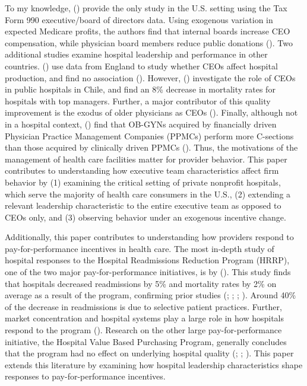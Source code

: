 \documentclass[12pt]{article}
\begin{document}
    To my knowledge, \citeauthor{brickley2010board} (\citeyear{brickley2010board}) provide the only study in the U.S. setting using the Tax Form 990 executive/board of directors data. Using exogenous variation in expected Medicare profits, the authors find that internal boards increase CEO compensation, while physician board members reduce public donations (\cite{brickley2010board}). Two additional studies examine hospital leadership and performance in other countries. \citeauthor{janke2019impact} (\citeyear{janke2019impact}) use data from England to study whether CEOs affect hospital production, and find no association (\cite{janke2019impact}). However, \citeauthor{munoz2025managers} (\citeyear{munoz2025managers}) investigate the role of CEOs in public hospitals in Chile, and find an 8\% decrease in mortality rates for hospitals with top managers. Further, a major contributor of this quality improvement is the exodus of older physicians as CEOs (\cite{munoz2025managers}). Finally, although not in a hospital context, \citeauthor{la2023impact} (\citeyear{la2023impact}) find that OB-GYNs acquired by financially driven Physician Practice Management Companies (PPMCs) perform more C-sections than those acquired by clinically driven PPMCs (\cite{la2023impact}). Thus, the motivations of the management of health care facilities matter for provider behavior. This paper contributes to understanding how executive team characteristics affect firm behavior by (1) examining the critical setting of private nonprofit hospitals, which serve the majority of health care consumers in the U.S., (2) extending a relevant leadership characteristic to the entire executive team as opposed to CEOs only, and (3) observing behavior under an exogenous incentive change.

    Additionally, this paper contributes to understanding how providers respond to pay-for-performance incentives in health care. The most in-depth study of hospital responses to the Hospital Readmissions Reduction Program (HRRP), one of the two major pay-for-performance initiatives, is by \citeauthor{gupta2021impacts} (\citeyear{gupta2021impacts}). This study finds that hospitals decreased readmissions by 5\% and mortality rates by 2\% on average as a result of the program, confirming prior studies (\cite{mellor2017does}; \cite{ziedan2018essays}; \cite{ody2019decreases}; \cite{gupta2021impacts}). Around 40\% of the decrease in readmissions is due to selective patient practices. Further, market concentration and hospital systems play a large role in how hospitals respond to the program (\cite{kunz2024assessing}). Research on the other large pay-for-performance initiative, the Hospital Value Based Purchasing Program, generally concludes that the program had no effect on underlying hospital quality (\cite{us2015hospital}; \cite{norton2018moneyball}; \cite{friedson2019so}). This paper extends this literature by examining how hospital leadership characteristics shape responses to pay-for-performance incentives.
    
\end{document}
